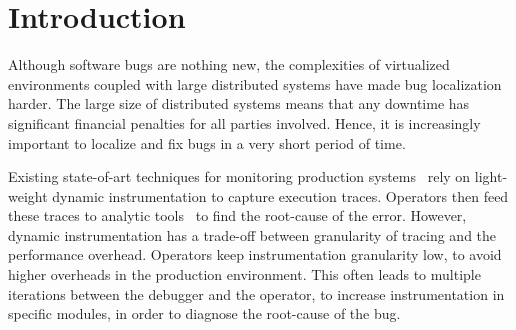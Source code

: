 
\section{Introduction}
\label{sec:intro}

Although software bugs are nothing new, the complexities of virtualized environments coupled with large distributed systems have made bug localization harder. 
The large size of distributed systems means that any downtime has significant financial penalties for all parties involved.
Hence, it is increasingly important to localize and fix bugs in a very short period of time.

Existing state-of-art techniques for monitoring production systems~\cite{dtrace, iProbe, winetw} rely on light-weight dynamic instrumentation to capture execution traces. 
Operators then feed these traces to analytic tools~\cite{magpie,clue} to find the root-cause of the error.
However, dynamic instrumentation has a trade-off between granularity of tracing and the performance overhead. 
Operators keep instrumentation granularity low, to avoid higher overheads in the production environment.
This often leads to multiple iterations between the debugger and the operator, to increase instrumentation in specific modules, in order to diagnose the root-cause of the bug. 

